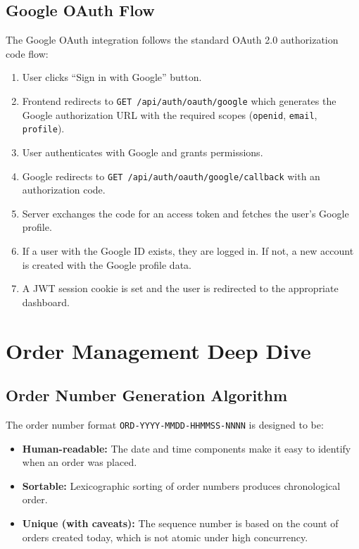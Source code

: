 \documentclass[12pt,a4paper]{report}
\begin{document}
\subsection{Google OAuth Flow}

The Google OAuth integration follows the standard OAuth 2.0 authorization code flow:

\begin{enumerate}[leftmargin=1.5em]
  \item User clicks ``Sign in with Google'' button.
  \item Frontend redirects to \texttt{GET /api/auth/oauth/google} which generates the Google authorization URL with the required scopes (\texttt{openid}, \texttt{email}, \texttt{profile}).
  \item User authenticates with Google and grants permissions.
  \item Google redirects to \texttt{GET /api/auth/oauth/google/callback} with an authorization code.
  \item Server exchanges the code for an access token and fetches the user's Google profile.
  \item If a user with the Google ID exists, they are logged in. If not, a new account is created with the Google profile data.
  \item A JWT session cookie is set and the user is redirected to the appropriate dashboard.
\end{enumerate}

\section{Order Management Deep Dive}

\subsection{Order Number Generation Algorithm}

The order number format \texttt{ORD-YYYY-MMDD-HHMMSS-NNNN} is designed to be:
\begin{itemize}[leftmargin=1.5em]
  \item \textbf{Human-readable:} The date and time components make it easy to identify when an order was placed.
  \item \textbf{Sortable:} Lexicographic sorting of order numbers produces chronological order.
  \item \textbf{Unique (with caveats):} The sequence number is based on the count of orders created today, which is not atomic under high concurrency.
\end{itemize}
\end{document}
